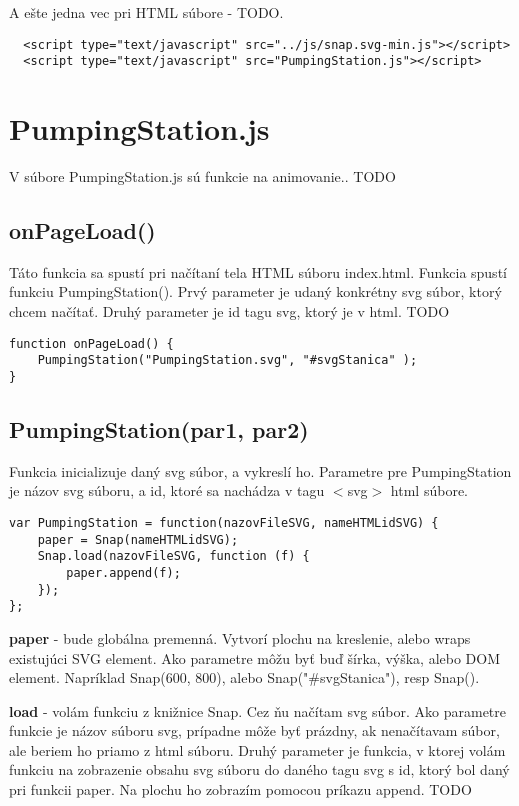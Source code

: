A ešte jedna vec pri HTML súbore - TODO. 
\begin{lstlisting}
  <script type="text/javascript" src="../js/snap.svg-min.js"></script>
  <script type="text/javascript" src="PumpingStation.js"></script>
\end{lstlisting}


\section{PumpingStation.js}

V súbore PumpingStation.js sú funkcie na animovanie.. TODO
\subsection{onPageLoad()}
Táto funkcia sa spustí pri načítaní tela HTML súboru index.html. Funkcia spustí funkciu PumpingStation(). Prvý parameter je udaný konkrétny svg súbor, ktorý chcem načítať. Druhý parameter je id tagu svg, ktorý je v html. TODO

\begin{lstlisting}
function onPageLoad() {
	PumpingStation("PumpingStation.svg", "#svgStanica" );
}
\end{lstlisting}

\subsection{PumpingStation(par1, par2)}

Funkcia inicializuje daný svg súbor, a vykreslí ho. 
Parametre pre PumpingStation je názov svg súboru, a id, ktoré sa nachádza v tagu $<$svg$>$ html súbore.

\begin{lstlisting}
var PumpingStation = function(nazovFileSVG, nameHTMLidSVG) {
	paper = Snap(nameHTMLidSVG);
	Snap.load(nazovFileSVG, function (f) {
		paper.append(f);
	});
};
\end{lstlisting}

\textbf{paper} - bude globálna premenná. Vytvorí plochu na  kreslenie, alebo  wraps existujúci SVG element. Ako parametre môžu byť buď šírka, výška, alebo DOM element. Napríklad Snap(600, 800), alebo Snap("\#svgStanica"), resp Snap(). 

\textbf{load} - volám funkciu z knižnice Snap. Cez ňu načítam  svg súbor. Ako parametre funkcie je názov súboru svg, prípadne môže byť prázdny, ak nenačítavam súbor, ale beriem ho priamo z html súboru. Druhý parameter je funkcia, v ktorej volám funkciu na zobrazenie obsahu svg súboru do daného tagu svg s  id, ktorý bol daný pri funkcii paper.  Na plochu ho zobrazím pomocou príkazu append. TODO

